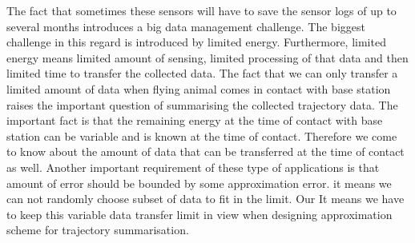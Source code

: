 \documentclass[conference]{IEEEtran}
\begin{document}
The fact that sometimes these sensors will have to save the sensor logs of up to several months
introduces a big data management challenge. The biggest challenge in this regard is introduced 
by limited energy. Furthermore, limited energy means limited amount of sensing, limited processing 
of that data and then limited time to transfer the collected data. The fact that we can only 
transfer a limited amount of data when flying animal comes in contact with base station raises the 
important question of summarising the collected trajectory data. The important fact is that the 
remaining energy at the time of contact with base station can be variable and is known at the time 
of contact. Therefore we come to know about the amount of data that can be transferred at the time of 
contact as well. Another important requirement of these type of applications is that amount of error 
should be bounded by some approximation error. it means we can not randomly choose subset of data 
to fit in the limit. Our It means we have to keep this variable data transfer limit in view when 
designing approximation scheme for trajectory summarisation.


\end{document}
